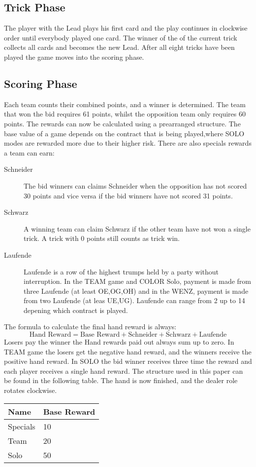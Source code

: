 \subsection{Trick Phase}
The player with the Lead plays his first card and the play continues in clockwise order until everybody played one
card.
The winner of the of the current trick collects all cards and becomes the new Lead.
After all eight tricks have been played the game moves into the scoring phase.
\subsection{Scoring Phase}
Each team counts their combined points, and a winner is determined.
The team that won the bid requires 61 points, whilst the opposition team only requires 60 points.
The rewards can now be calculated using a prearranged structure.
The base value of a game depends on the contract
that is being played,where SOLO modes are rewarded more due to their higher risk.
\newline
There are also specials rewards a team can earn:
\begin{description}
    \item[Schneider] The bid winners can claims Schneider when the opposition has not scored 30 points and vice versa
    if the bid winners have not scored 31 points.
    \item[Schwarz] A winning team can claim Schwarz if the other team have not won a single trick. A trick with 0
    points still counts as trick win.
    \item[Laufende] Laufende is a row of the highest trumps held by a party without interruption.
    In the TEAM game and COLOR Solo, payment is made from three Laufende (at least OE,OG,OH) and in the WENZ,
    payment is made from two Laufende (at leas UE,UG). Laufende can range from 2 up to 14 depening which contract is
    played.
\end{description}
The formula to calculate the final hand reward is always:
\[\text{Hand Reward} = \text{Base Reward} + \text{Schneider} + \text{Schwarz} + \text{Laufende}\]
Losers pay the winner the Hand rewards paid out always sum up to zero.
In TEAM game the losers get the negative hand reward, and the winners receive the positive hand reward.
In SOLO the bid winner receives three time the reward and each player receives a single hand reward.
The structure used in this paper can be found in the following table.
The hand is now finished, and the dealer role rotates clockwise.
\begin{table}[]
\begin{tabular}{ll}
    \toprule
    Name     & Base Reward \\
    \midrule
    Specials & 10          \\
    Team     & 20          \\
    Solo     & 50          \\
    \bottomrule
\end{tabular}\label{tab:table3}
\end{table}
